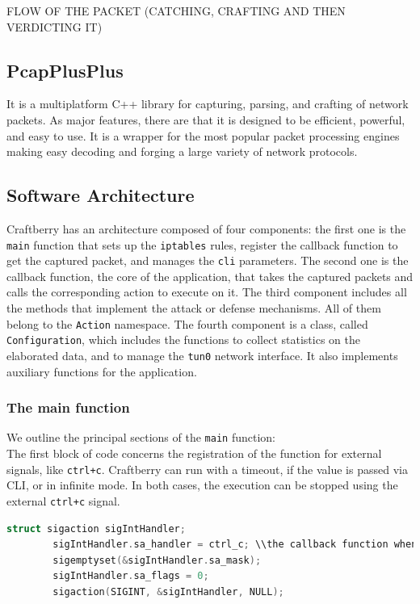 \documentclass[12pt]{article}
\begin{document}
	FLOW OF THE PACKET (CATCHING, CRAFTING AND THEN VERDICTING IT)

	\subsection{PcapPlusPlus}
	It is a multiplatform C++ library for capturing, parsing, and crafting of network packets. As major features, there are that it is designed to be efficient, powerful, and easy to use. It is a wrapper for the most popular packet processing engines making easy decoding and forging a large variety of network protocols.

	\subsection{Software Architecture}
	Craftberry has an architecture composed of four components: the first one is the \lstinline{main} function that sets up the \lstinline{iptables} rules, register the callback function to get the captured packet, and manages the \lstinline{cli} parameters. The second one is the callback function, the core of the application, that takes the captured packets and calls the corresponding action to execute on it. The third component includes all the methods that implement the attack or defense mechanisms. All of them belong to the \lstinline{Action} namespace. The fourth component is a class, called \lstinline{Configuration}, which includes the functions to collect statistics on the elaborated data, and to manage the \lstinline{tun0} network interface. It also implements auxiliary functions for the application.\\

	\subsubsection{The main function}

	We outline the principal sections of the \lstinline{main} function:\\
	The first block of code concerns the registration of the function for external signals, like \lstinline{ctrl+c}. Craftberry can run with a timeout, if the value is passed via CLI, or in infinite mode. In both cases, the execution can be stopped using the external \lstinline{ctrl+c} signal.\\
	\bigbreak

	\begin{lstlisting}[frame=single, language=C++]
		struct sigaction sigIntHandler;
		sigIntHandler.sa_handler = ctrl_c; \\the callback function when the signal is emitted
		sigemptyset(&sigIntHandler.sa_mask);
		sigIntHandler.sa_flags = 0;
		sigaction(SIGINT, &sigIntHandler, NULL);
	\end{lstlisting}
	\bigbreak
	
\end{document}
